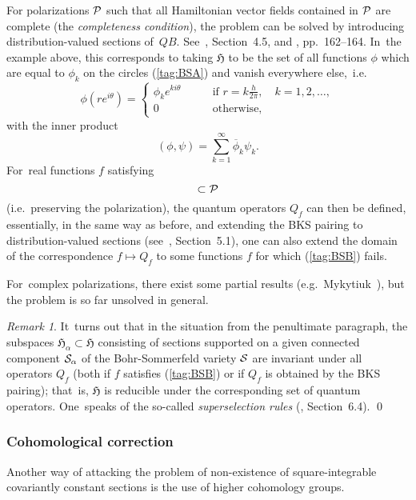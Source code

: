 \documentclass[11pt]{amsart}
\numberwithin{equation}{section}
\theoremstyle{remark}
\newtheorem{remark*}{Remark}
\newcommand\PP{{\Cal P}}
\newcommand\HH{\mathfrak H}
\begin{document}
For  polarizations $\PP$ such that all Hamiltonian vector fields
contained in $\PP$ are complete (the {\sl completeness condition\/}), the
problem can be solved by introducing distribution-valued sections of~$QB$.
See~\cite{bib:SniaB}, Section~4.5, and \cite{bib:WoodhOLD}, pp.~162--164.
In~the example above, this corresponds to taking $\HH$ to be the set of all
functions $\phi$ which are equal to $\phi_k$ on the circles (\ref{tag:BSA}) and
vanish everywhere else,~i.e.
\begin{equation}  \phi(r e^{i\theta}) = \begin{cases} \phi_k e^{ki\theta}
\qquad &\text{if }r=k\frac h{2\pi}, \quad k=1,2,\dots, \\ 0 &\text{otherwise,}
\end{cases}  \label{tag:PHI}  \end{equation}
with the inner product
$$ (\phi,\psi) = \sum_{k=1}^\infty \overline\phi_k \psi_k.  $$
For~real functions $f$ satisfying
\begin{equation}  [X_f,\PP]\subset\PP   \label{tag:BSB}  \end{equation}
(i.e.~preserving the polarization), the quantum operators $Q_f$ can then be
defined, essentially, in the same way as before, and extending the BKS pairing
to distribution-valued sections (see~\cite{bib:SniaB}, Section~5.1), one can
also extend the domain of the correspondence $f\mapsto Q_f$ to some functions
$f$ for which (\ref{tag:BSB}) fails.

For~complex polarizations, there exist some partial results
(e.g.~Mykytiuk~\cite{bib:Myky}), but the problem is so far unsolved in general.

\begin{remark*} It~turns out that in the situation from the penultimate
paragraph, the subspaces $\HH_\alpha\subset\HH$ consisting of sections
supported on a given connected component $\mathcal S_\alpha$ of the Bohr-Sommerfeld
variety $\mathcal S$ are invariant under all operators $Q_f$ (both if $f$ satisfies
(\ref{tag:BSB}) or if $Q_f$ is obtained by the BKS pairing); that~is, $\HH$ is
reducible under the corresponding set of quantum operators. One~speaks of the
so-called {\sl superselection rules\/} (\cite{bib:SniaB}, Section~6.4).  \qed
\end{remark*}

\subsubsection{Cohomological correction} \label{sec262}
Another way of attacking the problem of non-existence of square-integrable
covariantly constant sections is the use of higher cohomology groups.
\end{document}
